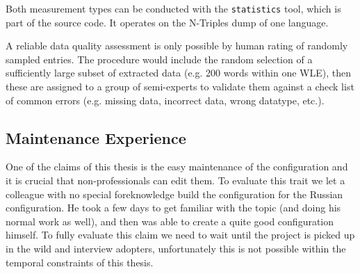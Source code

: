 Both measurement types can be conducted with the \texttt{statistics} tool, which is part of the source code. 
It operates on the N-Triples dump of one language. 

A reliable data quality assessment is only possible by human rating of randomly sampled entries. 
The procedure would include the random selection of a sufficiently large subset of extracted data (e.g. 200 words within one WLE), then these are assigned to a group of semi-experts to validate them against a check list of common errors (e.g. missing data, incorrect data, wrong datatype, etc.).

\subsection{Maintenance Experience}
One of the claims of this thesis is the easy maintenance of the configuration and it is crucial that non-professionals can edit them. 
To evaluate this trait we let a colleague with no special foreknowledge build the configuration for the Russian configuration. 
He took a few days to get familiar with the topic (and doing his normal work as well), and then was able to create a quite good configuration himself. 
To fully evaluate this claim we need to wait until the project is picked up in the wild and interview adopters, unfortunately this is not possible within the temporal constraints of this thesis.

